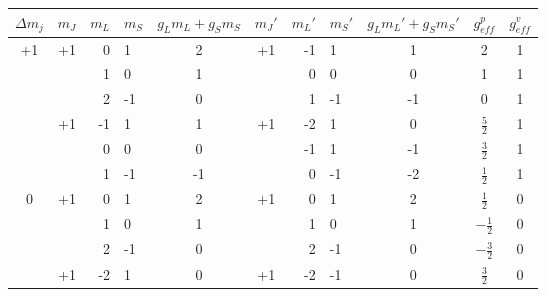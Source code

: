\documentclass[bigchapter,colorback,accentcolor=tud4b,linedtoc,11pt]{tudreport}
\begin{document}
\begin{table}[H]
  \begin{center}
  \def\arraystretch{1.25}
  \begin{tabular}{|c||c|r@{|}l|c||c|r@{|}l|c||c|c|}
    \hline
     $\Delta m_j$        & $m_J$               & $m_L$ & $m_S$ & $g_Lm_L+g_Sm_S$ & $m_J'$              & $m_L'$ & $m_S'$ & $g_Lm_L'+g_Sm_S'$ & $g^p_{eff}$    & $g^v_{eff}$ \\ \hline
     \multirow{6}{*}{+1} & \multirow{3}{*}{+1} & 0     & 1     & 2               & \multirow{3}{*}{+1} & -1     & 1      & 1                 & 2              & 1           \\ 
                         &                     & 1     & 0     & 1               &                     & 0      & 0      & 0                 & 1              & 1           \\ 
                         &                     & 2     & -1    & 0               &                     & 1      & -1     & -1                & 0              & 1           \\ \cline{2-11}
                         & \multirow{3}{*}{+1} & -1    & 1     & 1               & \multirow{3}{*}{+1} & -2     & 1      & 0                 & $\frac{5}{2}$  & 1           \\ 
                         &                     & 0     & 0     & 0               &                     & -1     & 1      & -1                & $\frac{3}{2}$  & 1           \\ 
                         &                     & 1     & -1    & -1              &                     & 0      & -1     & -2                & $\frac{1}{2}$  & 1           \\ \hline
     \multirow{6}{*}{0}  & \multirow{3}{*}{+1} & 0     & 1     & 2               & \multirow{3}{*}{+1} & 0      & 1      & 2                 & $\frac{1}{2}$  & 0           \\ 
                         &                     & 1     & 0     & 1               &                     & 1      & 0      & 1                 & $-\frac{1}{2}$ & 0           \\ 
                         &                     & 2     & -1    & 0               &                     & 2      & -1     & 0                 & $-\frac{3}{2}$ & 0           \\ \cline{2-11}
                         & \multirow{3}{*}{+1} & -2    & 1     & 0               & \multirow{3}{*}{+1} & -2     & -1     & 0                 & $\frac{3}{2}$  & 0           \\ 

\end{tabular}
\end{center}
\end{table}
\end{document}
